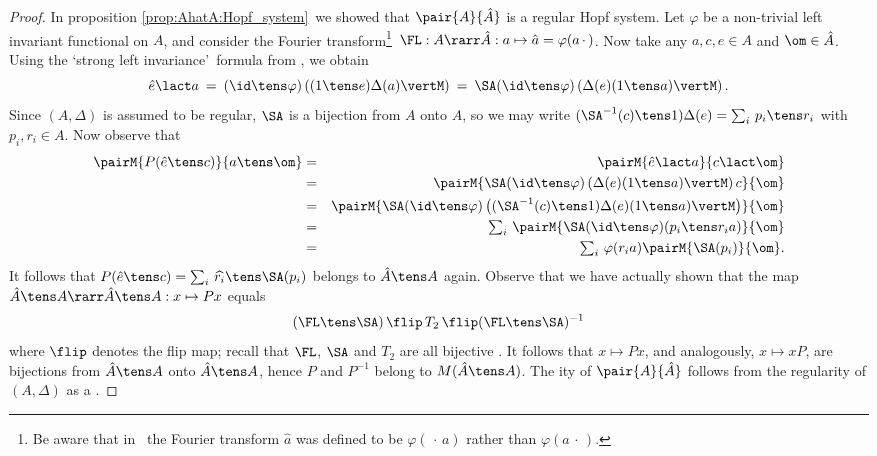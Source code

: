 \begin{proof}
In proposition \ref{prop:AhatA:Hopf_system}\ we showed that $\pair{A}{\hat{A}}$
is a regular Hopf system.
Let $\varphi$ be a non-trivial left invariant functional on $A$, and consider
the Fourier transform\footnote{Be aware that in \cite{Fons:AFGD}\ the
Fourier transform $\hat{a}$ was defined to be
$\varphi(\,\cdot\,a)$ rather than $\varphi(a\,\cdot\,)$.}\
$\FL: A \rarr \hat{A}: a \mapsto \hat{a} = \varphi(a\,\cdot\,)$.
Now take any $a,c,e \in A$ and $\om \in \hat{A}$.
Using the \lq strong left invariance\rq\ formula from \cite{Fons:AFGD}, we obtain
$$ \hat{e} \lact a \:=\:  (\id \tens \varphi)\left( (1 \tens e) \Delta(a) \vertM\right)
                   \:=\: \SA(\id \tens \varphi)\left( \Delta(e) (1 \tens a) \vertM\right). $$
Since $(A,\Delta)$ is assumed to be regular, $\SA$ is a bijection from $A$ onto $A$,
so we may write $(\SA^{-1}(c) \tens 1) \Delta(e) = \sum_i \, p_i \tens r_i$
with $p_i, r_i \in A$. Now observe that
\begin{eqnarray*}
\pairM{P(\hat{e} \tens c)}{a \tens \om}
  &=&
\pairM{\hat{e} \lact a}{c \lact \om}
\\&=&
\pairM{\SA(\id \tens \varphi)\left( \Delta(e) (1 \tens a) \vertM\right) c}{\om}
\\&=&
\pairM{\SA(\id \tens \varphi)\left( (\SA^{-1}(c) \tens 1) \Delta(e) (1 \tens a) \vertM\right)}{\om}
\\&=&
\textstyle \sum_i \, \pairM{\SA(\id \tens \varphi)(p_i \tens r_i a)}{\om}
\\&=&
\textstyle \sum_i \, \varphi(r_i a) \pairM{\SA(p_i)}{\om}.
\end{eqnarray*}
It follows that $P(\hat{e} \tens c) = \sum_i \,\widehat{r_i} \tens \SA(p_i)$
belongs to $\hat{A} \tens A$ again.
Observe that we have actually shown that the map
$\hat{A} \tens A \rarr \hat{A} \tens A : x \mapsto Px$ equals
$$ (\FL \tens \SA)\, \flip \, T_2 \, \flip (\FL \tens \SA)^{-1}  $$
where $\flip$ denotes the flip map;
recall that $\FL$, $\SA$ and $T_2$ are all bijective \cite{Fons:AFGD}.
It follows that $x \mapsto Px$, and analogously, $x \mapsto xP$,
are bijections from $\hat{A} \tens A$ onto $\hat{A} \tens A$,
hence $P$ and $P^{-1}$ belong to $M(\hat{A} \tens A)$.
The {\mr ity} of $\pair{A}{\hat{A}}$ follows from the regularity of $(A,\Delta)$
as a \mha.
\end{proof}


